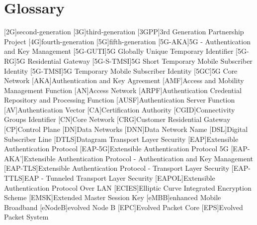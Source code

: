 \chapter{Glossary}

\footnotesize
\SingleSpacing

\begin{multicols}{2}
    \begin{acronym}[AAAAAA]
        [2G]{second-generation}
        [3G]{third-generation}
        [3GPP]{3rd Generation Partnership Project}
        [4G]{fourth-generation}
        [5G]{fifth-generation}
        [5G-AKA]{5G - Authentication and Key Management}
        [5G-GUTI]{5G Globally Unique Temporary Identifier}
        [5G-RG]{5G Residential Gateway}
        [5G-S-TMSI]{5G Short Temporary Mobile Subscriber Identity}
        [5G-TMSI]{5G Temporary Mobile Subscriber Identity}
        [5GC]{5G Core Network}
        [AKA]{Authentication and Key Agreement}
        [AMF]{Access and Mobility Management Function}
        [AN]{Access Network}
        [ARPF]{Authentication Credential Repository and Processing Function}
        [AUSF]{Authentication Server Function}
        [AV]{Authentication Vector}
        [CA]{Certification Authority}
        [CGID]{Connectivity Groups Identifier}
        [CN]{Core Network}
        [CRG]{Customer Residential Gateway}
        [CP]{Control Plane}
        [DN]{Data Networks}
        [DNN]{Data Network Name}
        [DSL]{Digital Subscriber Line}
        [DTLS]{Datagram Transport Layer Security}
        [EAP]{Extensible Authentication Protocol}
        [EAP-5G]{Extensible Authentication Protocol 5G}
        [EAP-AKA']{Extensible Authentication Protocol - Authentication and Key Management}
        [EAP-TLS]{Extensible Authentication Protocol - Transport Layer Security}
        [EAP-TTLS]{EAP - Tunneled Transport Layer Security}
        [EAPOL]{Extensible Authentication Protocol Over LAN}
        [ECIES]{Elliptic Curve Integrated Encryption Scheme}
        [EMSK]{Extended Master Session Key}
        [eMBB]{enhanced Mobile Broadband}
        [eNodeB]{evolved Node B}
        [EPC]{Evolved Packet Core}
        [EPS]{Evolved Packet System}

\end{acronym}
\end{multicols}
